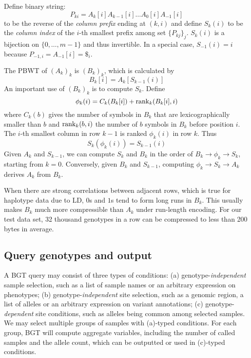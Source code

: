 \documentclass{bioinfo}
\begin{document}
\begin{methods}
Define binary string:
\[
P_{ki}=A_k[i]A_{k-1}[i]\ldots A_0[i]A_{-1}[i]
\]
to be the reverse of the \emph{column prefix} ending at $(k,i)$ and define $S_k(i)$ to
be the \emph{column index} of the $i$-th smallest prefix among set $\{P_{kj}\}_j$.
$S_k(i)$ is a bijection on $\{0,\ldots,m-1\}$ and thus invertible. In a
special case, $S_{-1}(i)=i$ because $P_{-1,i}=A_{-1}[i]=\$_i$.

The PBWT of $(A_k)_k$ is $(B_k)_k$, which is
calculated by
\begin{equation*}\label{eq:B}
B_k[i]=A_k[S_{k-1}(i)]
\end{equation*}
An important use of $(B_k)_k$ is to compute $S_k$. Define
\begin{equation*}\label{eq:phi}
\phi_k(i)=C_k(B_k[i])+{\rm rank}_k(B_k[i],i)
\end{equation*}
where $C_k(b)$ gives the number of symbols in $B_k$ that are lexicographically
smaller than $b$ and ${\rm rank}_k(b,i)$ the number of $b$ symbols in $B_k$
before position $i$. The $i$-th smallest column in row $k-1$ is ranked
$\phi_k(i)$ in row $k$. Thus
\begin{equation*}\label{eq:trans}
S_k(\phi_k(i))=S_{k-1}(i)
\end{equation*}
Given $A_k$ and $S_{k-1}$, we can compute $S_k$ and $B_k$ in the order of
$B_k\to\phi_k\to S_k$, starting from $k=0$. Conversely, given $B_k$ and
$S_{k-1}$, computing $\phi_k\to S_k\to A_k$ derives $A_k$ from $B_k$.

When there are strong correlations between adjacent rows, which is true for
haplotype data due to LD, $0$s and $1$s tend to form long
runs in $B_k$. This usually makes $B_k$ much more compressible than $A_k$ under
run-length encoding. For our test data set, 32 thousand genotypes in a row can
be compressed to less than 200 bytes in average.

\subsection{Query genotypes and output}

A BGT query may consist of three types of conditions: (a)
genotype-\emph{independent} sample selection, such as a list of sample names
or an arbitrary expression on phenotypes; (b) genotype-\emph{independent} site
selection, such as a genomic region, a list of alleles or an arbitrary
expression on variant annotations; (c) genotype-\emph{dependent} site
conditions, such as alleles being common among selected samples.
We may select multiple groups of samples with (a)-typed conditions. For each
group, BGT will compute aggregate variables, including the number of called
samples and the allele count, which can be outputted or used in (c)-typed
conditions.


\end{methods}
\end{document}
